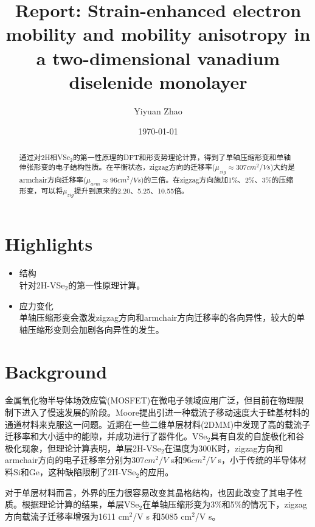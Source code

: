 \documentclass[reprint, aps, prb, showkeys]{revtex4-2}
\begin{document}
\title{Report: Strain-enhanced electron mobility and mobility anisotropy in a two-dimensional vanadium diselenide monolayer}

\author{Yiyuan Zhao}
\date{\today}

\begin{abstract}
通过对2H相VSe$_2$的第一性原理的DFT和形变势理论计算，得到了单轴压缩形变和单轴伸张形变的电子结构性质。在平衡状态，zigzag方向的迁移率($\mu_{zig} \approx 307 cm^2/V s$)大约是armchair方向迁移率($\mu_{arm} \approx 96 cm^2/V s$)的三倍。在zigzag方向施加1\%、2\%、3\%的压缩形变，可以将$\mu_{zig}$提升到原来的2.20、5.25、10.55倍。
\end{abstract}


\maketitle
\section{Highlights}
\begin{itemize}
    \item 结构 \\
    针对2H-VSe$_2$的第一性原理计算。
    \item 应力变化 \\
    单轴压缩形变会激发zigzag方向和armchair方向迁移率的各向异性，较大的单轴压缩形变则会加剧各向异性的发生。
\end{itemize}


\section{Background}
金属氧化物半导体场效应管(MOSFET)在微电子领域应用广泛，但目前在物理限制下进入了慢速发展的阶段。Moore提出引进一种载流子移动速度大于硅基材料的通道材料来克服这一问题。近期在一些二维单层材料(2DMM)中发现了高的载流子迁移率和大小适中的能隙，并成功进行了器件化。VSe$_2$具有自发的自旋极化和谷极化现象，但理论计算表明，单层2H-VSe$_2$在温度为300K时，zigzag方向和armchair方向的电子迁移率分别为$307 cm^2/V$ s和$96 cm^2/V$ s，小于传统的半导体材料Si和Ge，这种缺陷限制了2H-VSe$_2$的应用。

对于单层材料而言，外界的压力很容易改变其晶格结构，也因此改变了其电子性质。根据理论计算的结果，单层VSe$_2$在单轴压缩形变为3\%和5\%的情况下，zigzag方向载流子迁移率增强为1611 cm$^2$/V s 和5085 cm$^2$/V s。
\end{document}
